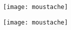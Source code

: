 \documentclass[12pt,a4paper]{article}
\date{}
\title{}
\begin{document}

%
%
%
%
%
%
%
%
%









\newpage

\begin{center}
	\texttt{[image: moustache]}
\end{center}

 \vspace*{2cm}

\begin{center}
	\texttt{[image: moustache]}
\end{center}
\end{document}
